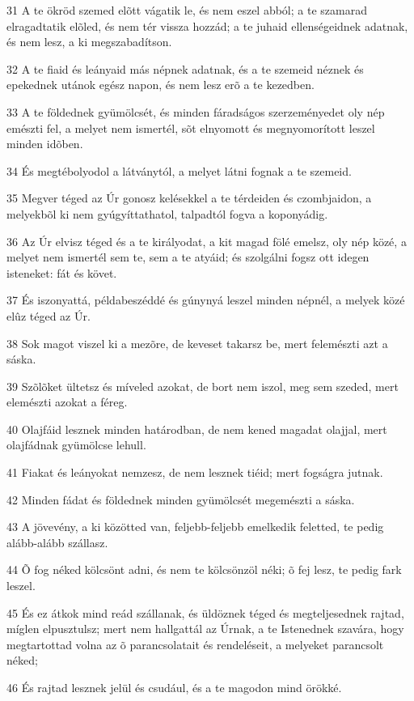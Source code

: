 \par 31 A te ökröd szemed elõtt vágatik le, és nem eszel abból; a te szamarad elragadtatik elõled, és nem tér vissza hozzád; a te juhaid ellenségeidnek adatnak, és nem lesz, a ki megszabadítson.
\par 32 A te fiaid és leányaid más népnek adatnak, és a te szemeid néznek és epekednek utánok egész napon, és nem lesz erõ a te kezedben.
\par 33 A te földednek gyümölcsét, és minden fáradságos szerzeményedet oly nép emészti fel, a melyet nem ismertél, sõt elnyomott és megnyomorított leszel minden idõben.
\par 34 És megtébolyodol a látványtól, a melyet látni fognak a te szemeid.
\par 35 Megver téged az Úr gonosz kelésekkel a te térdeiden és czombjaidon, a melyekbõl ki nem gyúgyíttathatol, talpadtól fogva a koponyádig.
\par 36 Az Úr elvisz téged és a te királyodat, a kit magad fölé emelsz, oly nép közé, a melyet nem ismertél sem te, sem a te atyáid; és szolgálni fogsz ott idegen isteneket: fát és követ.
\par 37 És iszonyattá, példabeszéddé és gúnynyá leszel minden népnél, a melyek közé elûz téged az Úr.
\par 38 Sok magot viszel ki a mezõre, de keveset takarsz be, mert felemészti azt a sáska.
\par 39 Szõlõket ültetsz és míveled azokat, de bort nem iszol, meg sem szeded, mert elemészti azokat a féreg.
\par 40 Olajfáid lesznek minden határodban, de nem kened magadat olajjal, mert olajfádnak gyümölcse lehull.
\par 41 Fiakat és leányokat nemzesz, de nem lesznek tiéid; mert fogságra jutnak.
\par 42 Minden fádat és földednek minden gyümölcsét megemészti a sáska.
\par 43 A jövevény, a ki közötted van, feljebb-feljebb emelkedik feletted, te pedig alább-alább szállasz.
\par 44 Õ fog néked kölcsönt adni, és nem te kölcsönzöl néki; õ fej lesz, te pedig fark leszel.
\par 45 És ez átkok mind reád szállanak, és üldöznek téged és megteljesednek rajtad, míglen elpusztulsz; mert nem hallgattál az Úrnak, a te Istenednek szavára, hogy megtartottad volna az õ parancsolatait és rendeléseit, a melyeket parancsolt néked;
\par 46 És rajtad lesznek jelül és csudául, és a te magodon mind örökké.
